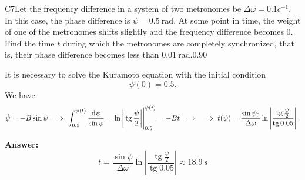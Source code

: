 \documentclass[11pt,a4paper]{article}
\begin{document}
\begin{solcard}{C7}{Let the frequency difference in a system of two metronomes be $\Delta \omega =0.1 c^{-1}$. In this case, the phase difference is $\psi = 0.5 ~\text{rad}$.  At some point in time, the weight of one of the metronomes shifts slightly and the frequency difference becomes $0$. Find the time $t$ during which the metronomes are completely synchronized, that is, their phase difference becomes less than $0.01~\text{rad}$.}{0.90}

It is necessary to solve the Kuramoto equation with the initial condition\[\psi(0)=0.5.\]We have\[\dot\psi=-B\sin\psi\implies\int_{0.5}^{\psi(t)}\frac{\mathrm d\psi}{\sin\psi}=\ln\bigg|\operatorname{tg}\frac\psi2\bigg|\Bigg|_{0.5}^{\psi(t)}=-Bt\implies\\\implies t(\psi)=\frac{\sin\psi_0}{\Delta\omega}\ln\left|\frac{\operatorname{tg}\frac\psi2}{\operatorname{tg}0.05}\right|.\]

\par\smallskip\noindent\textbf{Answer:} \[t=\frac{\sin\psi}{\Delta\omega}\ln\left|\frac{\operatorname{tg}\frac\psi2}{\operatorname{tg}0.05}\right|\approx18.9~\mathrm{s}\]
\end{solcard}
\end{document}

